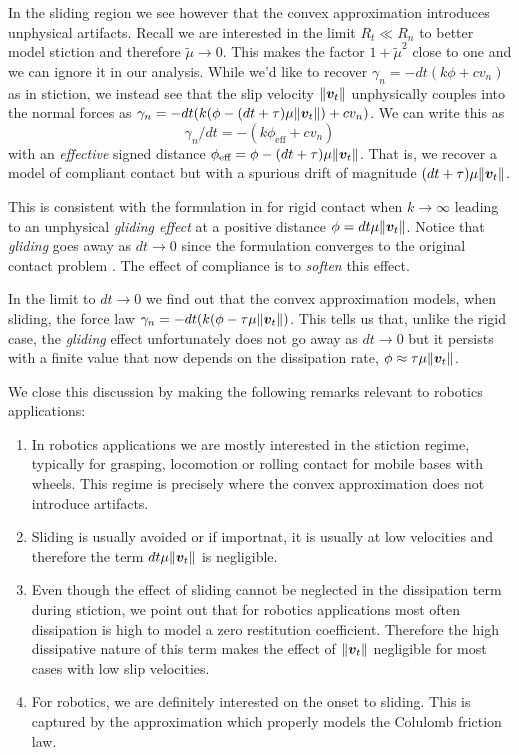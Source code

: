 In the sliding region we see however that the convex approximation introduces
unphysical artifacts. Recall we are interested in the limit $R_t \ll R_n$ to
better model stiction and therefore $\tilde\mu \rightarrow 0$. This makes the
factor $1+\tilde{\mu}^2$ close to one and we can ignore it in our analysis.
While we'd like to recover $\gamma_n = -dt(k\phi + c v_n)$ as in stiction, we
instead see that the slip velocity $\Vert{\bm{v}}_t\Vert$ unphysically couples
into the normal forces as $\gamma_n=-dt(k(\phi-(dt+\tau)\mu\Vert{\bm{v}}_t\Vert) +
cv_n)$. We can write this as
\begin{equation}
  \gamma_n/dt=-(k\phi_\text{eff} + c v_n)
\end{equation}
with an \textit{effective} signed distance $\phi_\text{eff} =
\phi-(dt+\tau)\mu\Vert{\bm{v}}_t\Vert$. That is, we recover a model of compliant
contact but with a spurious drift of magnitude $(dt+\tau)\mu\Vert{\bm{v}}_t\Vert$.

This is consistent with the formulation in \cite{bib:anitescu2010} for rigid
contact when $k\rightarrow \infty$ leading to an unphysical \textit{gliding
effect} at a positive distance $\phi=dt\mu\Vert{\bm{v}}_t\Vert$. Notice that
\textit{gliding} goes away as $dt\rightarrow 0$ since the formulation converges
to the original contact problem \cite{bib:anitescu2006}. The effect of
compliance is to \textit{soften} this effect. 

In the limit to $dt\rightarrow 0$ we find out that the convex approximation
models, when sliding, the force law
$\gamma_n=-dt(k(\phi-\tau\mu\Vert{\bm{v}}_t\Vert)$. This tells us that, unlike the
rigid case, the \textit{gliding} effect unfortunately does not go away as
$dt\rightarrow 0$ but it persists with a finite value that now depends on the
dissipation rate, $\phi\approx\tau\mu\Vert{\bm{v}}_t\Vert$.

We close this discussion by making the following remarks relevant to robotics
applications:
\begin{enumerate}
	\item In robotics applications we are mostly interested in the stiction
	regime, typically for grasping, locomotion or rolling contact for mobile
	bases with wheels. This regime is precisely where the convex approximation
	does not introduce artifacts.
	\item Sliding is usually avoided or if importnat, it is usually at low
	velocities and therefore the term $dt\mu\Vert{\bm{v}}_t\Vert$ is negligible.
	\item Even though the effect of sliding cannot be neglected in the
	dissipation term during stiction, we point out that for robotics
	applications most often dissipation is high to model a zero restitution
	coefficient. Therefore the high dissipative nature of this term makes the
	effect of $\Vert{\bm{v}}_t\Vert$ negligible for most cases with low slip
	velocities.
	\item For robotics, we are definitely interested on the onset to sliding.
	This is captured by the approximation which properly models the Colulomb
	friction law.
\end{enumerate}
